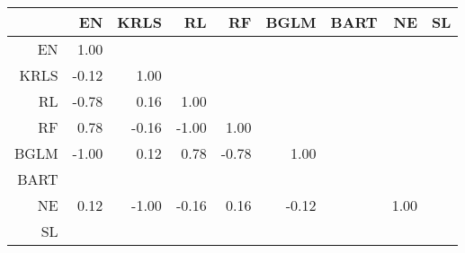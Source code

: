 \begin{table}[ht]
\centering
\begin{tabular}{rrrrrrrrr}
  \hline
 & EN & KRLS & RL & RF & BGLM & BART & NE & SL \\ 
  \hline
EN & 1.00 &  &  &  &  &  &  &  \\ 
  KRLS & -0.12 & 1.00 &  &  &  &  &  &  \\ 
  RL & -0.78 & 0.16 & 1.00 &  &  &  &  &  \\ 
  RF & 0.78 & -0.16 & -1.00 & 1.00 &  &  &  &  \\ 
  BGLM & -1.00 & 0.12 & 0.78 & -0.78 & 1.00 &  &  &  \\ 
  BART &  &  &  &  &  &  &  &  \\ 
  NE & 0.12 & -1.00 & -0.16 & 0.16 & -0.12 &  & 1.00 &  \\ 
  SL &  &  &  &  &  &  &  &  \\ 
   \hline
\end{tabular}
\end{table}
